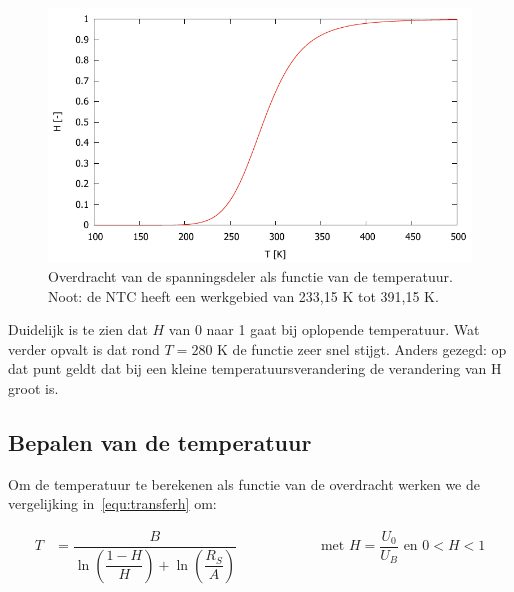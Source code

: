\documentclass[12pt,a4paper,final,twoside,fleqn]{article}
\let\oldcdot\cdot
\renewcommand{\cdot}{\kern-.10em\oldcdot\kern-.10em}
\begin{document}
\begin{figure}[ht!]
\centering
\includegraphics[scale=1]{gnuplot/transferfunctionH}
\caption[Overdracht van de spanningsdeler als functie van de temperatuur]{Overdracht van de spanningsdeler als functie van de temperatuur. Noot:
de NTC heeft een werkgebied van 233,15 K tot 391,15 K.}
\label{fig:transferfunctionz}
\end{figure}

Duidelijk is te zien dat $H$ van 0 naar 1 gaat bij oplopende temperatuur.
Wat verder opvalt is dat rond $T = 280$ K de functie zeer snel stijgt. Anders
gezegd: op dat punt geldt dat bij een kleine temperatuursverandering de verandering
van H groot is.

\subsection{Bepalen van de temperatuur}
Om de temperatuur te berekenen als functie van de overdracht werken we de
vergelijking in~\eqref{equ:transferh} om:

\begin{equation}
\label{equ:transferT}
\begin{split}
T  &= \dfrac{B}{\ln\left(\dfrac{1-H}{H}\right)+\ln\left(\dfrac{R_S}{A}\right)}\qquad\qquad\qquad\text{met }H = \dfrac{U_0}{U_B} \text{ en } 0<H<1
\end{split}
\end{equation}
\end{document}
